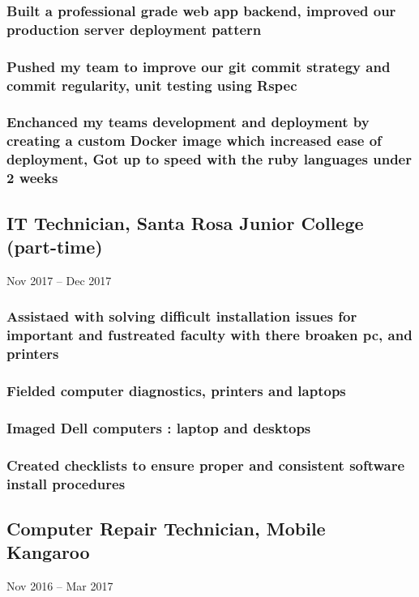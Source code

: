 \documentclass{article}
\begin{document}
	        \subsubsection{Built a professional grade web app backend, improved our production server deployment pattern}
            \subsubsection{Pushed my team to improve our git commit strategy and commit regularity, unit testing using Rspec}
            \subsubsection{Enchanced my teams development and deployment by creating a custom Docker image which increased ease of deployment, Got up to speed with the ruby languages under 2 weeks}
            
    \subsection{IT Technician, Santa Rosa Junior College (part-time)}Nov 2017 – Dec 2017
        
        \vspace{-2mm}
    	\subsubsection{Assistaed with solving difficult installation issues for important and fustreated faculty with there broaken pc, and printers  }
    	\subsubsection{Fielded computer diagnostics, printers and laptops }
    	\subsubsection{Imaged Dell computers : laptop and desktops }
    	\subsubsection{Created checklists to ensure proper and consistent software install procedures}
    	
    \subsection{Computer Repair Technician, Mobile Kangaroo} Nov 2016 – Mar 2017
        
\end{document}
